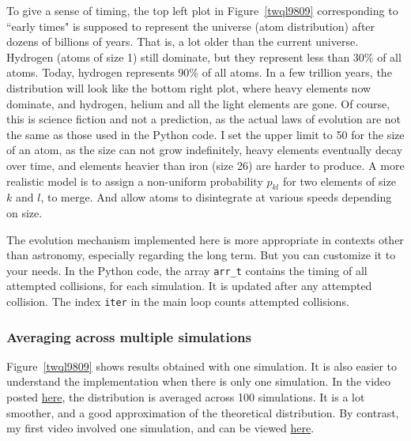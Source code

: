 \documentclass[oneside,10pt]{book}
\begin{document}
To give a sense of timing, the top left plot in Figure~\ref{twql9809} corresponding to ``early times"  is supposed to represent the universe (atom distribution) after dozens of billions of years. That is, a lot older than the current universe.
 Hydrogen (atoms of size 1) still dominate, but they represent less than 30\% of all atoms. Today, hydrogen represents 90\% of all atoms. In a few trillion years, the distribution will look like the bottom right plot, where heavy elements now dominate, and hydrogen, helium and all the light elements are gone. Of course, this is science fiction and not a prediction, as the actual laws of evolution are not the same as those used in the Python code. 
I set the upper limit to 50 for the size of an atom, as the size can not grow indefinitely, heavy elements eventually decay over time, and elements heavier than iron (size 26) are harder to produce. A more realistic model is to assign a non-uniform  probability $p_{kl}$ for two elements of size $k$ and $l$, to merge. And allow atoms to disintegrate at various speeds depending on size.  

The evolution mechanism implemented here is more appropriate in contexts other than astronomy, especially regarding the long term. But you can customize it to your needs. 
In the Python code, the array \texttt{arr\_t} contains the timing of all attempted collisions, for each simulation. It is updated after any attempted collision. The index \texttt{iter} in the main loop counts attempted collisions. 


\subsubsection{Averaging across multiple simulations}

Figure~\ref{twql9809} shows results obtained with one simulation. It is also easier to understand the implementation when there is only one simulation. In the video posted \href{https://www.youtube.com/watch?v=MUvoO9YmfgY}{here}, the distribution is averaged across 100 simulations. It is a lot smoother, and a good approximation of the theoretical distribution. By contrast, my first video involved one simulation, and
 can be viewed \href{https://www.youtube.com/watch?v=g3tc2ARw7B0}{here}. 
\end{document}

